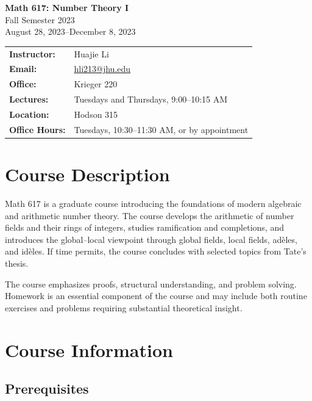 \documentclass[11pt]{article}
\begin{document}
\begin{center}
    {\Large \textbf{Math 617: Number Theory I}}\\[0.4em]
    {\large Fall Semester 2023}\\[0.4em]
    August 28, 2023--December 8, 2023
\end{center}

\vspace{1em}

\begin{center}
\begin{tabular}{ll}
\textbf{Instructor:} & Huajie Li \\
\textbf{Email:} & \href{mailto:hli213@jhu.edu}{hli213@jhu.edu} \\
\textbf{Office:} & Krieger 220 \\
\textbf{Lectures:} & Tuesdays and Thursdays, 9:00--10:15 AM \\
\textbf{Location:} & Hodson 315 \\
\textbf{Office Hours:} & Tuesdays, 10:30--11:30 AM, or by appointment \\
\end{tabular}
\end{center}

\section{Course Description}

Math 617 is a graduate course introducing the foundations of modern algebraic
and arithmetic number theory. The course develops the arithmetic of number
fields and their rings of integers, studies ramification and completions, and
introduces the global--local viewpoint through global fields, local fields,
adèles, and idèles. If time permits, the course concludes with selected topics
from Tate's thesis.

The course emphasizes proofs, structural understanding, and problem solving.
Homework is an essential component of the course and may include both routine
exercises and problems requiring substantial theoretical insight.

\section{Course Information}

\subsection{Prerequisites}
\end{document}
